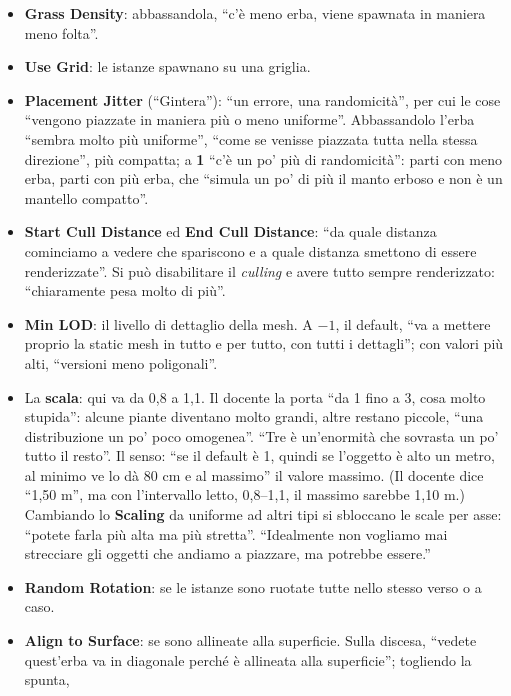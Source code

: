 \begin{itemize}
  \item \textbf{Grass Density}: abbassandola, ``c'è meno erba, viene spawnata in maniera meno
        folta''.
  \item \textbf{Use Grid}: le istanze spawnano su una griglia.
  \item \textbf{Placement Jitter} (``Gintera''): ``un errore, una randomicità'', per cui le
        cose ``vengono piazzate in maniera più o meno uniforme''. Abbassandolo l'erba ``sembra
        molto più uniforme'', ``come se venisse piazzata tutta nella stessa direzione'', più
        compatta; a \textbf{1} ``c'è un po' più di randomicità'': parti con meno erba, parti con
        più erba, che ``simula un po' di più il manto erboso e non è un mantello compatto''.
  \item \textbf{Start Cull Distance} ed \textbf{End Cull Distance}: ``da quale distanza
        cominciamo a vedere che spariscono e a quale distanza smettono di essere
        renderizzate''. Si può disabilitare il \emph{culling} e avere tutto sempre
        renderizzato: ``chiaramente pesa molto di più''.
  \item \textbf{Min LOD}: il livello di dettaglio della mesh. A \textbf{$-1$}, il default,
        ``va a mettere proprio la static mesh in tutto e per tutto, con tutti i dettagli''; con
        valori più alti, ``versioni meno poligonali''.
  \item La \textbf{scala}: qui va da 0,8 a 1,1. Il docente la porta ``da 1 fino a 3, cosa molto
        stupida'': alcune piante diventano molto grandi, altre restano piccole, ``una
        distribuzione un po' poco omogenea''. ``Tre è un'enormità che sovrasta un po' tutto il
        resto''. Il senso: ``se il default è 1, quindi se l'oggetto è alto un metro, al minimo
        ve lo dà 80 cm e al massimo'' il valore massimo. (Il docente dice ``1,50 m'', ma con
        l'intervallo letto, 0,8--1,1, il massimo sarebbe 1,10 m.) Cambiando lo
        \textbf{Scaling} da uniforme ad altri tipi si sbloccano le scale per asse: ``potete
        farla più alta ma più stretta''. ``Idealmente non vogliamo mai strecciare gli oggetti
        che andiamo a piazzare, ma potrebbe essere.''
  \item \textbf{Random Rotation}: se le istanze sono ruotate tutte nello stesso verso o a
        caso.
  \item \textbf{Align to Surface}: se sono allineate alla superficie. Sulla discesa, ``vedete
        quest'erba va in diagonale perché è allineata alla superficie''; togliendo la spunta,

\end{itemize}
